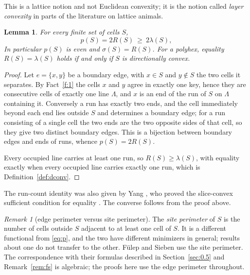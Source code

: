 \documentclass[11pt]{article}
\theoremstyle{plain}
\newtheorem{lemma}[theorem]{Lemma}
\theoremstyle{definition}
\theoremstyle{remark}
\newtheorem{remark}[theorem]{Remark}
\begin{document}
This is a lattice notion and not Euclidean convexity; it is the notion called
\emph{layer convexity} in parts of the literature on lattice animals.

\begin{lemma}\label{lem:runs}
For every finite set of cells \(S\),
\begin{equation}\label{eq:pruns}
   p(S)=2R(S)\ \ge\ 2\lambda(S),
\end{equation}
In particular \(p(S)\) is even and
\(\sigma(S)=R(S)\). For a polyhex, equality \(R(S)=\lambda(S)\) holds if and only if
\(S\) is directionally convex.
\end{lemma}

\begin{proof}
Let \(e=\{x,y\}\) be a boundary edge, with \(x\in S\) and \(y\notin S\) the two cells it
separates. By Fact~\ref{f:1} the cells \(x\) and \(y\) agree in exactly one key, hence
they are consecutive cells of exactly one line \(\Lambda\), and \(x\) is an end of the run
of \(S\) on \(\Lambda\) containing it. Conversely a run has exactly two ends, and the cell
immediately beyond each end lies outside \(S\) and determines a boundary edge; for a run
consisting of a single cell the two ends are the two opposite sides of that cell, so they
give two distinct boundary edges. This is a bijection between boundary edges and ends of
runs, whence \(p(S)=2R(S)\).

Every occupied line carries at least one run, so \(R(S)\ge\lambda(S)\), with equality
exactly when every occupied line carries exactly one run, which is
Definition~\ref{def:dconv}.
\end{proof}
\noindent The run-count identity was also given by Yang \cite[Theorem~4]{Yang2002},
who proved the slice-convex sufficient condition for equality
\cite[Theorem~5]{Yang2002}. The converse follows from the proof above.


\begin{remark}[edge perimeter versus site perimeter]\label{rem:site}
The \emph{site perimeter} of $S$ is the number of cells outside $S$ adjacent to at
least one cell of $S$. It is a different functional from \eqref{eq:p}, and the two have
different minimizers in general; results about one do not transfer to the other.
F\"ulep and Sieben \cite{FulepSieben2010} use the site perimeter. The correspondence
with their formulas described in Section~\ref{sec:0.5} and Remark~\ref{rem:fs} is
algebraic; the proofs here use the edge perimeter throughout.
\end{remark}
\end{document}
